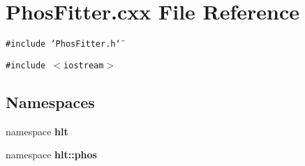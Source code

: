 \section{Phos\-Fitter.cxx File Reference}
\label{PhosFitter_8cxx}
{\tt \#include \char`\"{}Phos\-Fitter.h\char`\"{}}\par
{\tt \#include $<$iostream$>$}\par
\subsection*{Namespaces}
\begin{CompactItemize}
\item 
namespace {\bf hlt}
\item 
namespace {\bf hlt::phos}
\end{CompactItemize}
